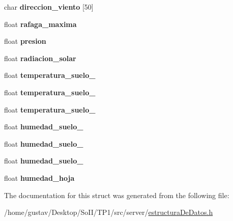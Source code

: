 \begin{DoxyCompactItemize}
\item 
char {\bfseries direccion\+\_\+viento} \mbox{[}50\mbox{]}\hypertarget{struct_datos_a45cef589f882fa71f1858f1b49a6bc04}{}\label{struct_datos_a45cef589f882fa71f1858f1b49a6bc04}

\item 
float {\bfseries rafaga\+\_\+maxima}\hypertarget{struct_datos_ace2f0b795da8e43046290c8742e52400}{}\label{struct_datos_ace2f0b795da8e43046290c8742e52400}

\item 
float {\bfseries presion}\hypertarget{struct_datos_a954f16304cc74c7f802fd4c7ae0ab6e4}{}\label{struct_datos_a954f16304cc74c7f802fd4c7ae0ab6e4}

\item 
float {\bfseries radiacion\+\_\+solar}\hypertarget{struct_datos_a0bb5b179275442bd885712fd4f50f764}{}\label{struct_datos_a0bb5b179275442bd885712fd4f50f764}

\item 
float {\bfseries temperatura\+\_\+suelo\+\_}\hypertarget{struct_datos_a9d1c4a836e69751161cbe256df9aaa18}{}\label{struct_datos_a9d1c4a836e69751161cbe256df9aaa18}

\item 
float {\bfseries temperatura\+\_\+suelo\+\_}\hypertarget{struct_datos_ab3596321aecd928ef050330b0c07b045}{}\label{struct_datos_ab3596321aecd928ef050330b0c07b045}

\item 
float {\bfseries temperatura\+\_\+suelo\+\_}\hypertarget{struct_datos_a293c94226b6f318dd596fd7d37f191d0}{}\label{struct_datos_a293c94226b6f318dd596fd7d37f191d0}

\item 
float {\bfseries humedad\+\_\+suelo\+\_}\hypertarget{struct_datos_a4326774f4fb38d85599f29f0fba13fde}{}\label{struct_datos_a4326774f4fb38d85599f29f0fba13fde}

\item 
float {\bfseries humedad\+\_\+suelo\+\_}\hypertarget{struct_datos_a482801d4473f3cdf1caeea18704219a8}{}\label{struct_datos_a482801d4473f3cdf1caeea18704219a8}

\item 
float {\bfseries humedad\+\_\+suelo\+\_}\hypertarget{struct_datos_ac8d49bd55d0cf4e4129c142068dc417b}{}\label{struct_datos_ac8d49bd55d0cf4e4129c142068dc417b}

\item 
float {\bfseries humedad\+\_\+hoja}\hypertarget{struct_datos_a9fc4a4eba0726e4d744cd6572eb9c250}{}\label{struct_datos_a9fc4a4eba0726e4d744cd6572eb9c250}

\end{DoxyCompactItemize}


The documentation for this struct was generated from the following file\+:\begin{DoxyCompactItemize}
\item 
/home/gustav/\+Desktop/\+So\+I\+I/\+T\+P1/src/server/\hyperlink{estructura_de_datos_8h}{estructura\+De\+Datos.\+h}\end{DoxyCompactItemize}

